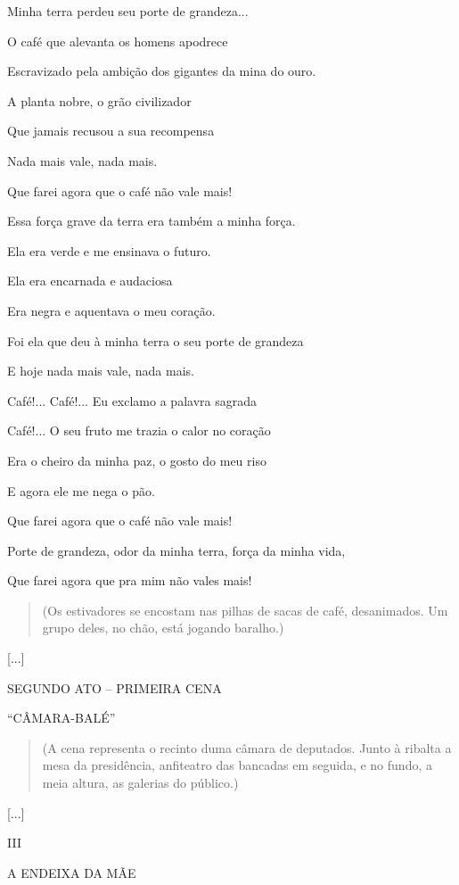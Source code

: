 Minha terra perdeu seu porte de grandeza...

O café que alevanta os homens apodrece

Escravizado pela ambição dos gigantes da mina do ouro.

A planta nobre, o grão civilizador

Que jamais recusou a sua recompensa

Nada mais vale, nada mais.

Que farei agora que o café não vale mais!

Essa força grave da terra era também a minha força.

Ela era verde e me ensinava o futuro.

Ela era encarnada e audaciosa

Era negra e aquentava o meu coração.

Foi ela que deu à minha terra o seu porte de grandeza

E hoje nada mais vale, nada mais.

Café!... Café!... Eu exclamo a palavra sagrada

Café!... O seu fruto me trazia o calor no coração

Era o cheiro da minha paz, o gosto do meu riso

E agora ele me nega o pão.

Que farei agora que o café não vale mais!

Porte de grandeza, odor da minha terra, força da minha vida,

Que farei agora que pra mim não vales mais!

\begin{quote}
(Os estivadores se encostam nas pilhas de sacas de café, desanimados. Um
grupo deles, no chão, está jogando baralho.)
\end{quote}

{[}...{]}

SEGUNDO ATO -- PRIMEIRA CENA

``CÂMARA-BALÉ''

\begin{quote}
(A cena representa o recinto duma câmara de deputados. Junto à ribalta a
mesa da presidência, anfiteatro das bancadas em seguida, e no fundo, a
meia altura, as galerias do público.)
\end{quote}

{[}...{]}

III

A ENDEIXA DA MÃE

